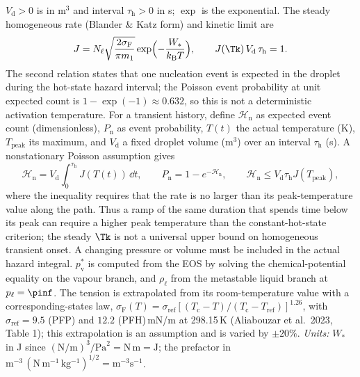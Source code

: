 $V_{\mathrm d}>0$ is in m$^3$ and interval $\tau_{\mathrm h}>0$ in s; $\exp$ is the exponential.
The steady homogeneous rate (Blander \& Katz form) and kinetic limit are
\begin{equation}
J=N_\ell\sqrt{\frac{2\sigma_{\mathrm F}}{\pi m_1}}\exp\Bigl(-\frac{W_*}{k_{\mathrm B}T}\Bigr),\qquad
J(\Tk)\,V_{\mathrm d}\,\tau_{\mathrm h}=1 .\label{eq:cnt}
\end{equation}
The second relation states that one nucleation event is expected in the droplet during the hot-state hazard
interval; the Poisson event probability at unit expected count is $1-\exp(-1)\approx0.632$,
so this is not a deterministic activation temperature. For a transient history, define
$\mathcal H_{\mathrm n}$ as expected event count (dimensionless), $P_{\mathrm n}$ as event probability,
$T(t)$ the actual temperature (K), $T_{\mathrm{peak}}$ its maximum, and $V_{\mathrm d}$ a fixed
droplet volume (m$^3$) over an interval $\tau_{\mathrm h}$ (s). A nonstationary Poisson assumption gives
\begin{equation}
\mathcal H_{\mathrm n}=V_{\mathrm d}\int_0^{\tau_{\mathrm h}}J(T(t))\,\dd t,
\qquad P_{\mathrm n}=1-e^{-\mathcal H_{\mathrm n}},\qquad
\mathcal H_{\mathrm n}\le V_{\mathrm d}\tau_{\mathrm h}J(T_{\mathrm{peak}}),\label{eq:cnt_hazard}
\end{equation}
where the inequality requires that the rate is no larger than its peak-temperature value along
the path. Thus a ramp of the same duration that spends time below its peak can require a higher
peak temperature than the constant-hot-state criterion; the steady $\Tk$ is not a universal
upper bound on homogeneous transient onset. A changing pressure or volume must be included in
the actual hazard integral. $p_{\mathrm v}^*$ is computed from the EOS by solving the chemical-potential equality on the vapour
branch, and $\rho_\ell$ from the metastable liquid branch at $p_\ell=\pinf$. The tension is extrapolated
from its room-temperature value with a corresponding-states law,
$\sigma_{\mathrm F}(T)=\sigma_{\mathrm{ref}}[(T_{\mathrm c}-T)/(T_{\mathrm c}-T_{\mathrm{ref}})]^{1.26}$, with
$\sigma_{\mathrm{ref}}=9.5$ (PFP) and $12.2$ (PFH)\,mN/m at 298.15\,K (Aliabouzar et al.\ 2023, Table 1); this
extrapolation is an assumption and is varied by $\pm20\%$.
\emph{Units:} $W_*$ in J since $(\mathrm N/\mathrm m)^3/\mathrm{Pa}^2=\mathrm N\,\mathrm m=\mathrm J$; the prefactor in
$\mathrm m^{-3}\,(\mathrm{N\,m^{-1}\,kg^{-1}})^{1/2}=\mathrm m^{-3}\mathrm s^{-1}$.

